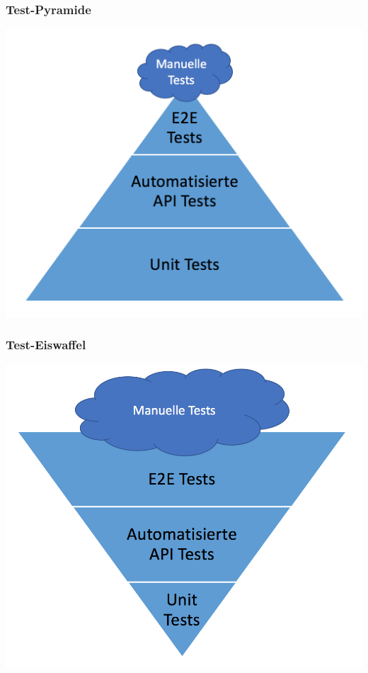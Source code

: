 \begin{frame}
\frametitle{Test-Pyramide}
	\center\includegraphics[width=1\textwidth,
		keepaspectratio=true]{bilder/test_pyramide.png}
	\end{frame}

\begin{frame}
\frametitle{Test-Eiswaffel}
	\center\includegraphics[width=1\textwidth,
		keepaspectratio=true]{bilder/test_eiswaffel.png}
\end{frame}

